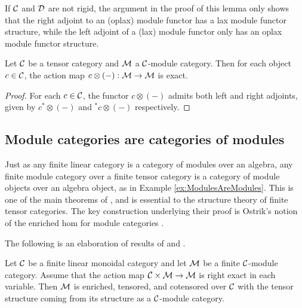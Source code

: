 \documentclass{amsart}
\begin{document}
\begin{remark}
If $\mathcal C$ and $\mathcal D$ are not rigid, the argument in the proof of this lemma only shows that the right adjoint to an (oplax) module functor has a lax module functor structure, while the left adjoint of a (lax) module functor only has an oplax module functor structure.  %
\end{remark}

\begin{lemma}\label{lem:partially_exact_action} \cite[Prop. 1.13.1]{EGNO} \cite[Prop. 2.1.8]{MR1797619}
	Let $\mathcal C$ be a tensor category and $\mathcal M$ a $\mathcal C$-module category. Then for each object $c \in \mathcal C$, the action map $c \otimes (-): \mathcal M \to \mathcal M$ is exact. 
\end{lemma}

\begin{proof}
	For each $c \in \mathcal C$, the functor $c \otimes (-)$ admits both left and right adjoints, given by $c^* \otimes (-)$ and ${}^*c \otimes (-)$ respectively. 
\end{proof}



\subsection{Module categories are categories of modules}


Just as any finite linear category is a category of modules over an algebra, any finite module category over a finite tensor category is a category of module objects over an algebra object, as in Example \ref{ex:ModulesAreModules}.  This is one of the main theorems of \cite{EGNO}, and is essential to the structure theory of finite tensor categories.  The key construction underlying their proof is Ostrik's notion of the enriched hom for module categories \cite{MR1976459}.  

The following is an elaboration of results of \cite{MR1976459} and \cite{EO-ftc}. %
\begin{proposition} \label{thm:enrichment-of-mod-cats}
	Let $\mathcal C$ be a finite linear monoidal category and let $\mathcal M$ be a finite $\mathcal C$-module category. Assume that the action map $\mathcal C \times \mathcal M \to \mathcal M$ is right exact in each variable. 
		Then $\mathcal M$ is enriched, tensored, and cotensored over $\mathcal C$ with the tensor structure coming from its structure as a $\mathcal C$-module category. 
\end{proposition}
\end{document}
